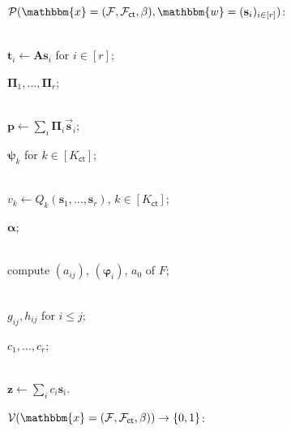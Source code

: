 \documentclass[../../book.tex]{subfiles}
\begin{document}
\begin{algoproto}[ht]
    \footnotesize
    \centering
    \begin{mdframed}[linecolor=black, linewidth=1pt,
                     skipabove=10pt, skipbelow=10pt,
                     innerleftmargin=5pt, innerrightmargin=5pt]
        \begin{minipage}[t]{0.49\linewidth}
            \colorbox{oc-blue-1}{$\mathcal{P}(\mathbbm{x} = (\mathcal{F}, \mathcal{F}_{\mathsf{ct}}, \beta), \mathbbm{w} = (\mathbf{s}_i)_{i \in [r]})$:}
            \begin{algoen}
                \item {} \\  $\mathbf{t}_i \gets \mathbf{A}\mathbf{s}_i$ for $i \in [r]$;
                \item {} $\boldsymbol{\Pi}_1, \dots, \boldsymbol{\Pi}_r$;
                \item {} \\  $\mathbf{p} \gets \sum_{i} \boldsymbol{\Pi}_i\vec{\mathbf{s}}_i$;
                \item {} $\boldsymbol{\psi}_k$ for $k \in [K_{\mathsf{ct}}]$;
                \item {} \\  $v_k \gets Q_k(\mathbf{s}_1, \dots, \mathbf{s}_r)$, $k \in [K_{\mathsf{ct}}]$;
                \item {} $\boldsymbol{\alpha}$;
                \item {} \\ compute $(a_{ij})$, $(\boldsymbol{\varphi}_i)$, $a_0$ of $F$;
                \item {} \\  $g_{ij}, h_{ij}$ for $i \leq j$;
                \item {} $c_1, \dots, c_r$;
                \item {} \\  $\mathbf{z} \gets \sum_{i} c_i\mathbf{s}_i$.
            \end{algoen}
        \end{minipage}
        \hfill
        \begin{minipage}[t]{0.49\linewidth}
            \colorbox{oc-blue-1}{$\mathcal{V}(\mathbbm{x} = (\mathcal{F}, \mathcal{F}_{\mathsf{ct}}, \beta)) \to \{0,1\}$:}

\end{minipage}
\end{mdframed}
\end{algoproto}
\end{document}
